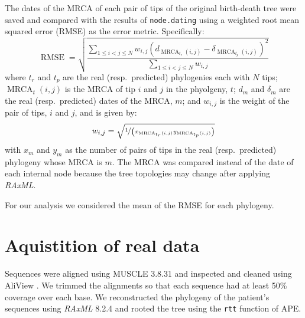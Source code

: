 \documentclass[12pt]{article}
\newcommand{\code}[1]{{\tt #1}}
\begin{document}
The dates of the MRCA of each pair of tips of the original birth-death tree were saved and compared with the results of \code{node.dating} using a weighted root mean squared error (RMSE) as the error metric.
Specifically:
\[\operatorname{RMSE} = \sqrt{\frac{\sum_{1 \leq i < j \leq N}w_{i,j}\left(d_{\operatorname{MRCA}_{t_r}(i,j)} - \delta_{\operatorname{MRCA}_{t_p}(i,j)}\right)^2}{\sum_{1 \leq i < j \leq N}w_{i,j}}}\]
where $t_r$ and $t_p$ are the real (resp.~predicted) phylogenies each with $N$ tips; $\operatorname{MRCA}_t(i, j)$ is the MRCA of tip $i$ and $j$ in the phyolgeny, $t$; $d_{m}$ and $\delta_m$ are the real (resp.~predicted) dates of the MRCA, $m$; and $w_{i, j}$ is the weight of the pair of tips, $i$ and $j$, and is given by:
\[w_{i, j} = \sqrt{\nicefrac{1}{\left(x_{\operatorname{MRCA}_{t_r}(i,j)}y_{\operatorname{MRCA}_{t_p}(i,j)}\right)}}\]
with $x_m$ and $y_m$ as the number of pairs of tips in the real (resp.~predicted) phylogeny whose MRCA is $m$.
The MRCA was compared instead of the date of each internal node because the tree topologies may change after applying \emph{RAxML}.

For our analysis we considered the mean of the RMSE for each phylogeny.

\section{Aquistition of real data}
Sequences were aligned using MUSCLE 3.8.31 \citep{Muscle04} and inspected and cleaned using AliView \citep{AliView14}. 
We trimmed the alignments so that each sequence had at least 50\% coverage over each base.
We reconstructed the phylogeny of the patient's sequences using \emph{RAxML} 8.2.4 \citep{Raxml14} and rooted the tree using the \code{rtt} function of APE.



\end{document}

